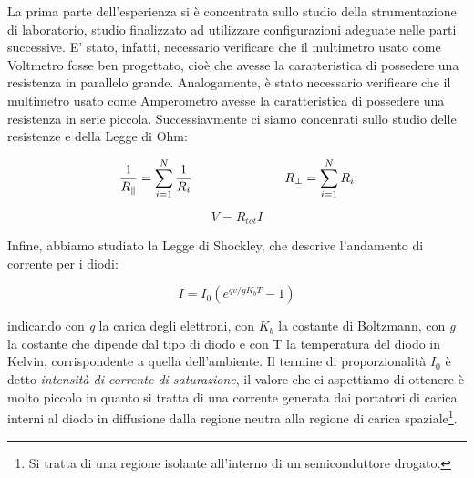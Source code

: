 La prima parte dell'esperienza si è concentrata sullo studio della strumentazione di laboratorio, studio finalizzato ad utilizzare configurazioni adeguate nelle parti successive. E' stato, infatti, necessario verificare che il multimetro usato come Voltmetro fosse ben progettato, cioè che avesse la caratteristica di possedere una resistenza in parallelo grande. Analogamente, è stato necessario verificare che il multimetro usato come Amperometro avesse la caratteristica di possedere una resistenza in serie piccola.
Successiavmente ci siamo concenrati sullo studio delle resistenze e della Legge di Ohm:

\begin{equation}
\frac{1}{R_{\parallel}}=\sum_{i=1}^{N}\frac{1}{R_{i}} \hspace{73 pt} R_{\perp}=\sum_{i=1}^{N}R_{i}
\end{equation}

\begin{equation}
V=R_{tot}I
\end{equation}

Infine, abbiamo studiato la Legge di Shockley, che descrive l'andamento di corrente per i diodi:

\begin{equation}
I=I_{0}(e^{qv/gK_b T}-1)
\end{equation}

indicando con \textit{q} la carica degli elettroni, con $K_b$ la costante di Boltzmann, con \textit{g} la costante che dipende dal tipo di diodo e con T la temperatura del diodo in Kelvin, corrispondente a quella dell'ambiente. Il termine di proporzionalità $I_0$ è detto \textit{intensità di corrente di saturazione}, il valore che ci aspettiamo di ottenere è molto piccolo in quanto si tratta di una corrente generata dai portatori di carica interni al diodo in diffusione dalla regione neutra alla regione di carica spaziale\footnote{Si tratta di una regione isolante all'interno di un semiconduttore drogato.}.